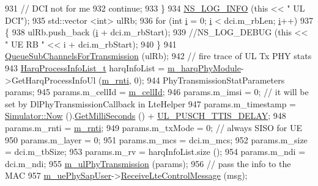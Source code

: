 \begin{DoxyCode}
931               \textcolor{comment}{// DCI not for me}
932               \textcolor{keywordflow}{continue};
933             \}
934           \hyperlink{group__logging_gafbd73ee2cf9f26b319f49086d8e860fb}{NS\_LOG\_INFO} (\textcolor{keyword}{this} << \textcolor{stringliteral}{" UL DCI"});
935           std::vector <int> ulRb;
936           \textcolor{keywordflow}{for} (\textcolor{keywordtype}{int} \hyperlink{bernuolliDistribution_8m_a6f6ccfcf58b31cb6412107d9d5281426}{i} = 0; \hyperlink{bernuolliDistribution_8m_a6f6ccfcf58b31cb6412107d9d5281426}{i} < dci.m\_rbLen; \hyperlink{bernuolliDistribution_8m_a6f6ccfcf58b31cb6412107d9d5281426}{i}++)
937             \{
938               ulRb.push\_back (\hyperlink{bernuolliDistribution_8m_a6f6ccfcf58b31cb6412107d9d5281426}{i} + dci.m\_rbStart);
939               \textcolor{comment}{//NS\_LOG\_DEBUG (this << " UE RB " << i + dci.m\_rbStart);}
940             \}
941           \hyperlink{classns3_1_1LteUePhy_a228ae97dfcf1f7eacf67817581be786b}{QueueSubChannelsForTransmission} (ulRb);
942           \textcolor{comment}{// fire trace of UL Tx PHY stats}
943           \hyperlink{namespacens3_a8e9da9f7a4e5c0954a109b0e1dc36e40}{HarqProcessInfoList\_t} harqInfoList = 
      \hyperlink{classns3_1_1LteUePhy_a9dcf48a436307726a8a1c6ce697983d8}{m\_harqPhyModule}->GetHarqProcessInfoUl (\hyperlink{classns3_1_1LteUePhy_a887b5dc4e246a308cd09127b64ed8fac}{m\_rnti}, 0);
944           PhyTransmissionStatParameters params;
945           params.m\_cellId = \hyperlink{classns3_1_1LtePhy_ac53d10d27f1bde64807a3ff366662787}{m\_cellId};
946           params.m\_imsi = 0; \textcolor{comment}{// it will be set by DlPhyTransmissionCallback in LteHelper}
947           params.m\_timestamp = \hyperlink{classns3_1_1Simulator_ac3178fa975b419f7875e7105be122800}{Simulator::Now} ().\hyperlink{classns3_1_1Time_aba3428a8b6c4c8d9014ce44145081f34}{GetMilliSeconds} () + 
      \hyperlink{lte-common_8h_afbe3b423f9aed03e1ef065bf3753a6d4}{UL\_PUSCH\_TTIS\_DELAY};
948           params.m\_rnti = \hyperlink{classns3_1_1LteUePhy_a887b5dc4e246a308cd09127b64ed8fac}{m\_rnti};
949           params.m\_txMode = 0; \textcolor{comment}{// always SISO for UE}
950           params.m\_layer = 0;
951           params.m\_mcs = dci.m\_mcs;
952           params.m\_size = dci.m\_tbSize;
953           params.m\_rv = harqInfoList.size ();
954           params.m\_ndi = dci.m\_ndi;
955           \hyperlink{classns3_1_1LteUePhy_ac202a6c628e4657e46db7746728b1162}{m\_ulPhyTransmission} (params);
956           \textcolor{comment}{// pass the info to the MAC}
957           \hyperlink{classns3_1_1LteUePhy_a18ef57afea937e2e4bcc5b87bfd6ae68}{m\_uePhySapUser}->\hyperlink{classns3_1_1LteUePhySapUser_abf93eec5c0ad47e505381e26b5dc0a85}{ReceiveLteControlMessage} (msg);

\end{DoxyCode}
